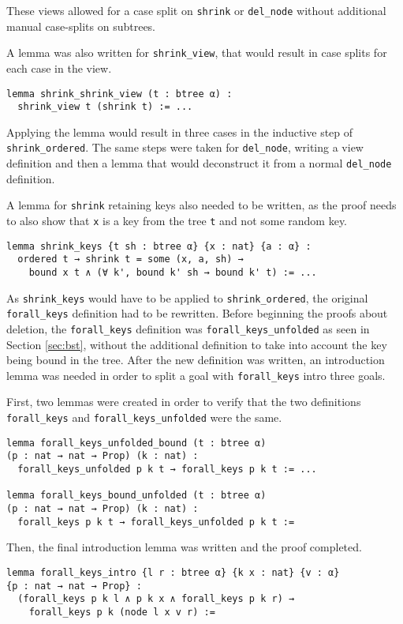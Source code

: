 These views allowed for a case split on \lstinline{shrink} or \lstinline{del_node} without additional manual case-splits on subtrees.

A lemma was also written for \lstinline{shrink_view}, that would result in case splits for each case in the view. 

\begin{lstlisting}
lemma shrink_shrink_view (t : btree α) : 
  shrink_view t (shrink t) := ...
\end{lstlisting}

Applying the lemma would result in three cases in the inductive step of \lstinline{shrink_ordered}. The same steps were taken for \lstinline{del_node}, writing a view definition and then a lemma that would deconstruct it from a normal \lstinline{del_node} definition.

A lemma for \lstinline{shrink} retaining keys also needed to be written, as the proof needs to also show that \lstinline{x} is a key from the tree \lstinline{t} and not some random key.

\begin{lstlisting}
lemma shrink_keys {t sh : btree α} {x : nat} {a : α} :
  ordered t → shrink t = some (x, a, sh) → 
    bound x t ∧ (∀ k', bound k' sh → bound k' t) := ...
\end{lstlisting}

As \lstinline{shrink_keys} would have to be applied to \lstinline{shrink_ordered}, the original \lstinline{forall_keys} definition had to be rewritten. Before beginning the proofs about deletion, the \lstinline{forall_keys} definition was \lstinline{forall_keys_unfolded} as seen in Section \ref{sec:bst}, without the additional definition to take into account the key being bound in the tree. After the new definition was written, an introduction lemma was needed in order to split a goal with \lstinline{forall_keys} intro three goals. 

First, two lemmas were created in order to verify that the two definitions \lstinline{forall_keys} and \lstinline{forall_keys_unfolded} were the same. 

\begin{lstlisting}
lemma forall_keys_unfolded_bound (t : btree α) 
(p : nat → nat → Prop) (k : nat) :
  forall_keys_unfolded p k t → forall_keys p k t := ...

lemma forall_keys_bound_unfolded (t : btree α) 
(p : nat → nat → Prop) (k : nat) :
  forall_keys p k t → forall_keys_unfolded p k t :=
\end{lstlisting}

Then, the final introduction lemma was written and the proof completed. 

\begin{lstlisting}
lemma forall_keys_intro {l r : btree α} {k x : nat} {v : α} 
{p : nat → nat → Prop} :
  (forall_keys p k l ∧ p k x ∧ forall_keys p k r) → 
    forall_keys p k (node l x v r) :=
\end{lstlisting}